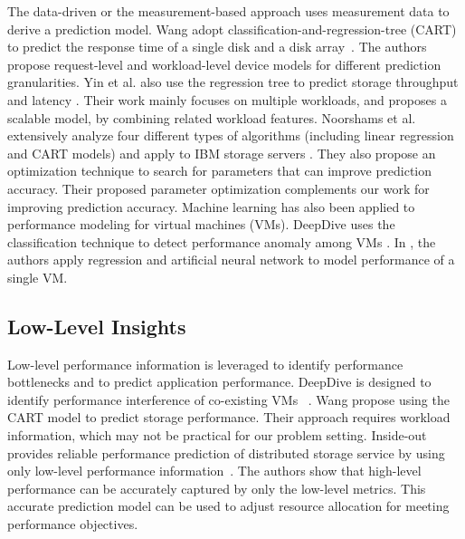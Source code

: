 The data-driven or the measurement-based approach
uses measurement data to derive a prediction model. 
Wang \etal adopt classification-and-regression-tree (CART) to predict the response time of a single disk and a disk array~\cite{Wang2004}.
The authors propose request-level and workload-level device models for different prediction granularities.
Yin et al. also use the regression tree to predict storage throughput and latency \cite{Yin2006}.
Their work mainly focuses on multiple workloads, and proposes a scalable model, by combining related workload features.
Noorshams et al. extensively analyze four different types of algorithms 
(including linear regression and CART models) and apply to IBM storage servers \cite{Noorshams2013}.
They also propose an optimization technique to search for parameters that can improve prediction accuracy.
Their proposed parameter optimization complements our work for improving prediction accuracy.
Machine learning has also been applied to performance modeling for virtual machines (VMs).
DeepDive uses the classification technique to detect performance anomaly among VMs \cite{Novakovic2013}.
In \cite{Kundu2010}, the authors apply regression and artificial neural network to model performance of a single VM.

\subsection{Low-Level Insights}
Low-level performance information is leveraged
to identify performance bottlenecks and to predict application performance.
DeepDive is designed to identify performance interference of co-existing VMs
~\cite{Novakovic2013}.
Wang \etal propose using the CART model to predict storage performance.
Their approach requires workload information, which may not be practical
for our problem setting.
Inside-out provides reliable performance prediction of distributed storage
service by using only low-level performance information~\cite{Hsu2016}.
The authors show that high-level performance can be accurately captured
by only the low-level metrics.
This accurate prediction model can be used to adjust resource allocation
for meeting performance objectives.


